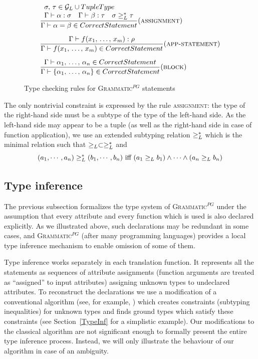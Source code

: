 \documentclass{llncs2e/llncs}
\newcommand{\trule}[3]{%
\dfrac{#1}{#2}(\mbox{\textsc{#3}})
}
\newcommand{\secref}[1]{Section~\ref{#1}}
\newcommand{\ATF}{\textsc{Grammatic}$^{PG}$}
\begin{document}
\begin{figure}[htbp]
$$
\begin{array}{l}
\trule{
\begin{array}{l}
\sigma,\,\tau \in \G \cup \TUP
\\
\Gamma \vdash \alpha : \sigma 
\quad 
\Gamma \vdash \beta : \tau 
\quad 
\sigma \gel^* \tau
\end{array}
}{\Gamma \vdash \alpha = \beta \in CorrectStatement}{assignment}
\vspace{10pt}
\\
\trule{
\Gamma \vdash f(x_1,\,\ldots,\,x_m) : \rho
}{
\Gamma \vdash f(x_1,\,\ldots,\,x_m) \in CorrectStatement
}{app-statement}
\vspace{10pt}
\\
\trule{
\Gamma \vdash \alpha_1,\,\ldots,\,\alpha_n \in CorrectStatement
}{\Gamma \vdash \left\{ \alpha_1,\,\ldots,\,\alpha_n \right\} \in CorrectStatement}{block}
\end{array}
$$
\caption{Type checking rules for \ATF{} statements}\label{statypes}
\end{figure}

The only nontrivial constraint is expressed by the rule \textsc{assignment}: the type of the right-hand side must be a subtype of the type of the left-hand side. As the left-hand side may appear to be a tuple (as well as the right-hand side in case of function application), we use an extended subtyping relation $\ge_L^*$ which is the minimal relation such that $\ge_L \subset \ge_L^*$ and
$$(a_1,\cdots,a_n)\ge_L^*(b_1,\cdots,b_n)\mbox{ iff } (a_1 \ge_L b_1) \wedge \cdots \wedge (a_n \ge_L b_n)$$


\subsection{Type inference}\label{TypeInference}

The previous subsection formalizes the type system of \ATF{} under the assumption that every attribute and every function which is used is also declared explicitly. As we illustrated above, such declarations may be redundant in some cases, and \ATF{} (after many programming languages) provides a local type inference mechanism to enable omission of some of them.  

Type inference works separately in each translation function. It represents all the statements as sequences of attribute assignments (function arguments are treated as ``assigned'' to input attributes) assigning unknown types to undeclared attributes. To reconstruct the declarations we use a modification of a conventional algorithm (see, for example, \cite{Pierce}) which creates constraints (subtyping inequalities) for unknown types and finds ground types which satisfy these constraints (see \secref{TypeInf} for a simplistic example). Our modifications to the classical algorithm are not significant enough to formally present the entire type inference process. Instead, we will only illustrate the behaviour of our algorithm in case of an ambiguity.
\end{document}
